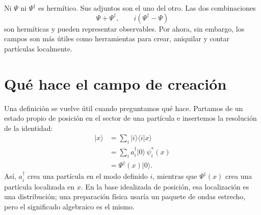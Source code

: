 Ni \(\Psi\) ni \(\Psi^\dagger\) es hermítico. Sus adjuntos son el uno del otro. Las dos combinaciones
\begin{equation}
\Psi+\Psi^\dagger,
\qquad
i(\Psi^\dagger-\Psi)
\label{eq:l07-hermitian-combinations}
\end{equation}
son hermíticas y pueden representar observables. Por ahora, sin embargo, los campos son más útiles como herramientas para crear, aniquilar y contar partículas localmente.

\begin{classroomqa}
\end{classroomqa}

\section{Qué hace el campo de creación}

Una definición se vuelve útil cuando preguntamos qué hace. Partamos de un estado propio de posición en el sector de una partícula e insertemos la resolución de la identidad:
\begin{align}
|x\rangle
&=\sum_i |i\rangle\langle i|x\rangle \\
&=\sum_i a_i^\dagger|0\rangle\,\psi_i^*(x) \\
&=\Psi^\dagger(x)|0\rangle.
\label{eq:l07-local-creation}
\end{align}
Así, \(a_i^\dagger\) crea una partícula en el modo definido \(i\), mientras que \(\Psi^\dagger(x)\) crea una partícula localizada en \(x\). En la base idealizada de posición, esa localización es una distribución; una preparación física usaría un paquete de ondas estrecho, pero el significado algebraico es el mismo.

\begin{classroomqa}
\end{classroomqa}

